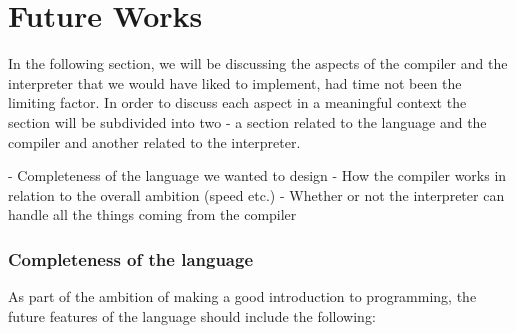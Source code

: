 \chapter{Future Works}

In the following section, we will be discussing the aspects of the compiler and the interpreter that we would have liked to implement, had time not been the limiting factor. In order to discuss each aspect in a meaningful context the section will be subdivided into two - a section related to the language and the compiler and another related to the interpreter.

- Completeness of the language we wanted to design
- How the compiler works in relation to the overall ambition (speed etc.)
- Whether or not the interpreter can handle all the things coming from the compiler

\subsection*{Completeness of the language}
As part of the ambition of making \dazel{} a good introduction to programming, the future features of the language should include the following: 

